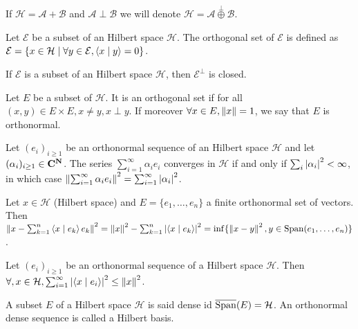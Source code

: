 \begin{note}
	If $\mathcal{H} = \mathcal{A} + \mathcal{B}$ and $\mathcal{A} \perp \mathcal{B}$ we will denote $\mathcal{H} = \mathcal{A} \overset{\perp}{\oplus} \mathcal{B}$.
\end{note}

\begin{defn}
	Let $\mathcal{E}$ be a subset of an Hilbert space $\mathcal{H}$.
	The orthogonal set of $\mathcal{E}$ is defined as $\mathcal{E} = \{ x \in \mathcal{H} \mid \forall y \in \mathcal{E}, \left\langle x \mid y \right\rangle = 0 \}$.
\end{defn}

\begin{thm}
	If $\mathcal{E}$ is a subset of an Hilbert space $\mathcal{H}$, then $\mathcal{E}^{\perp}$ is closed.
\end{thm}

\begin{defn}
	Let $E$ be a subset of $\mathcal{H}$.
	It is an orthogonal set if for all $(x,y) \in E \times E, x \neq y, x \perp y$.
	If moreover $\forall x \in E, \left\lVert x\right\rVert = 1$, we say that $E$ is orthonormal.
\end{defn}

\begin{thm}
	Let $(e_{i})_{i \geq 1}$ be an orthonormal sequence of an Hilbert space $\mathcal{H}$ and let $(\alpha_{i})_{i \geq 1} \in \mathbf{C}^{\mathbf{N}}$.
	The series $\sum_{i = 1}^\infty \alpha_i e_i$ converges in $\mathcal{H}$ if and only if $\sum_i \left\lvert\alpha_i\right\rvert^2 < \infty$, in which case $\left\lVert\sum_{i = 1}^\infty \alpha_i e_i\right\rVert^2 = \sum_{i = 1}^\infty \left\lvert\alpha_i\right\rvert^2$.
\end{thm}

\begin{pop}
	Let $x \in \mathcal{H}$ (Hilbert space) and $E = \{ e_1, \ldots, e_n \}$ a finite orthonormal set of vectors.
	Then $\left\lVert x - \sum_{k = 1}^n \left\langle x \mid e_k \right\rangle e_k\right\rVert^2
		= \left\lVert x\right\rVert^2 - \sum_{k = 1}^n \left\lvert\left\langle x \mid e_k \right\rangle\right\rvert^2
		= \inf \{ \left\lVert x - y\right\rVert^2, y \in \operatorname{Span}(e_1, \ldots, e_n) \}$.
\end{pop}

\begin{cor}
	Let $(e_i)_{i \geq 1}$ be an orthonormal sequence of a Hilbert space $\mathcal{H}$.
	Then$\forall, x \in \mathcal{H}, \sum_{i = 1}^\infty \left\lvert\left\langle x \mid e_i \right\rangle\right\rvert^2 \leq \left\lVert x\right\rVert^2$.
\end{cor}

\begin{defn}
	A subset $E$ of a Hilbert space $\mathcal{H}$ is said dense id $\overline{\operatorname{Span}}(E) = \mathcal{H}$.
	An orthonormal dense sequence is called a Hilbert basis.
\end{defn}

